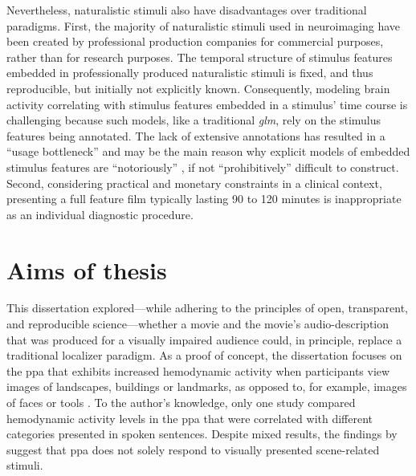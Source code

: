 Nevertheless, naturalistic stimuli also have disadvantages over traditional
paradigms.
First, the majority of naturalistic stimuli used in neuroimaging have been
created by professional production companies for commercial purposes, rather
than for research purposes.
The temporal structure of stimulus features embedded in professionally produced
naturalistic stimuli is fixed, and thus reproducible, but initially not
explicitly known.
Consequently, modeling brain activity correlating with stimulus features
embedded in a stimulus' time course is challenging
\citep{saarimaki2021naturalistic, simony2020analysis} because such models, like
a traditional \textit{\ac{glm}}, rely on the stimulus features being annotated.
The lack of extensive annotations has resulted in a ``usage bottleneck''
\citep[][p.  16]{aliko2020naturalistic} and may be the main reason why explicit
models of embedded stimulus features are ``notoriously'' \citep[][p.
1]{richard2019fast}, if not ``prohibitively'' \citep[p.
676]{nastase2019measuring} difficult to construct.
Second, considering practical and monetary constraints in a clinical context,
presenting a full feature film typically lasting 90 to 120 minutes is
inappropriate as an individual diagnostic procedure.





\section{Aims of thesis}



This dissertation explored---while adhering to the principles of
open, transparent, and reproducible science---whether a movie and the movie's
audio-description that was produced for a visually impaired audience could, in
principle, replace a traditional localizer paradigm.
As a proof of concept, the dissertation focuses on the \ac{ppa} that exhibits
increased hemodynamic activity when participants view images of landscapes,
buildings or landmarks, as opposed to, for example, images of faces or tools
\citep[s.][for reviews]{epstein2014neural, aminoff2013role}.
To the author's knowledge, only one study \citep{aziz2008modulation}
compared hemodynamic activity levels in the \ac{ppa} that were correlated with
different categories presented in spoken sentences.
%
Despite mixed results, the findings by \citet{aziz2008modulation} suggest that
\ac{ppa} does not solely respond to visually presented scene-related stimuli.

